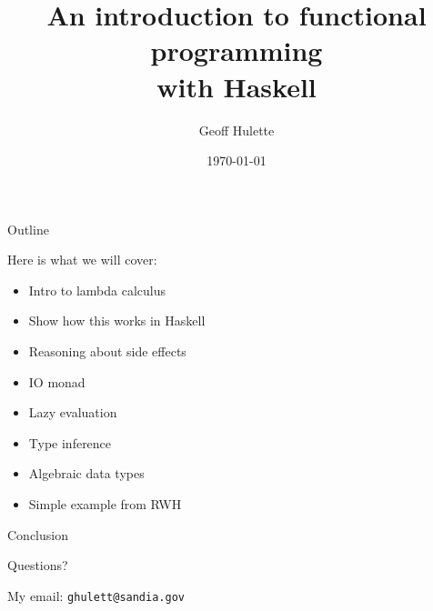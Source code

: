 \documentclass{beamer}
\title{An introduction to functional programming\\with Haskell}
\author{Geoff Hulette}
\date{\today}
\begin{document}
\begin{frame}[plain]
  \titlepage
\end{frame}

\begin{frame}[fragile]{Outline}

Here is what we will cover:

\begin{itemize}
  \item Intro to lambda calculus
  \item Show how this works in Haskell
  \item Reasoning about side effects
  \item IO monad
  \item Lazy evaluation
  \item Type inference
  \item Algebraic data types
  \item Simple example from RWH
\end{itemize}

\end{frame}


\begin{frame}{Conclusion}

Questions?

My email: \texttt{ghulett@sandia.gov}

\end{frame}
\end{document}
